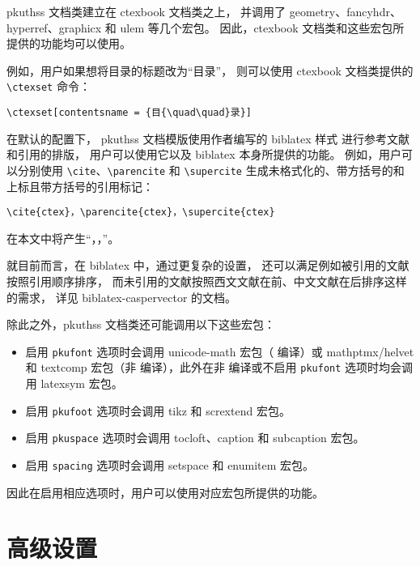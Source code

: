 pkuthss 文档类建立在 ctexbook 文档类之上，
并调用了 geometry、fancyhdr、%
hyperref、graphicx
和 ulem 等几个宏包。
因此，ctexbook 文档类和这些宏包所提供的功能均可以使用。

例如，用户如果想将目录的标题改为“目{\quad\quad}录”，
则可以使用 ctexbook 文档类提供的 \verb|\ctexset| 命令：
\begin{Verbatim}
\ctexset[contentsname = {目{\quad\quad}录}]
\end{Verbatim}

在默认的配置下，%
pkuthss 文档模版使用作者编写的 biblatex 样式%
进行参考文献和引用的排版，
用户可以使用它以及 biblatex 本身所提供的功能。
例如，用户可以分别使用 \verb|\cite|、\verb|\parencite| 和 \verb|\supercite|
生成未格式化的、带方括号的和上标且带方括号的引用标记：
\begin{Verbatim}
\cite{ctex}，\parencite{ctex}，\supercite{ctex}
\end{Verbatim}
在本文中将产生“\cite{ctex}，\parencite{ctex}，\supercite{ctex}”。

就目前而言，在 biblatex 中，通过更复杂的设置，
还可以满足例如被引用的文献按照引用顺序排序，
而未引用的文献按照西文文献在前、中文文献在后排序这样的需求，
详见 biblatex-caspervector 的文档。

除此之外，pkuthss 文档类还可能调用以下这些宏包：
\begin{itemize}
  \item 启用 \verb|pkufont| 选项时会调用 unicode-math
     宏包（ 编译）或
    mathptmx/helvet 和 textcomp 宏包（非
     编译），此外在非  编译或不启用
    \verb|pkufont| 选项时均会调用 latexsym 宏包。
  \item 启用 \verb|pkufoot| 选项时会调用
    tikz 和 scrextend 宏包。
  \item 启用 \verb|pkuspace| 选项时会调用
    tocloft、caption 和
    subcaption 宏包。
  \item 启用 \verb|spacing| 选项时会调用 setspace 和
    enumitem 宏包。
\end{itemize}
因此在启用相应选项时，用户可以使用对应宏包所提供的功能。

\section{高级设置}\label{sec:advanced}

